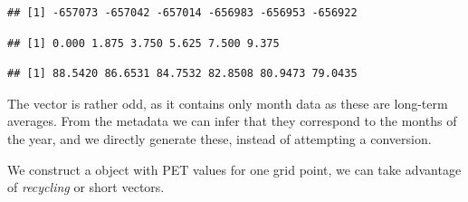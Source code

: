 \documentclass[krantz2,ChapterTOCs]{krantz}\usepackage{knitr}
\begin{document}
\begin{knitrout}\footnotesize
{}\color{fgcolor}\begin{kframe}
\begin{alltt}
 \hlkwb{<-}  \hlstd{)}
\end{alltt}
\begin{verbatim}
## [1] -657073 -657042 -657014 -656983 -656953 -656922
\end{verbatim}
\begin{alltt}
 \hlkwb{<-}   \hlstd{)}
\end{alltt}
\begin{verbatim}
## [1] 0.000 1.875 3.750 5.625 7.500 9.375
\end{verbatim}
\begin{alltt}
 \hlkwb{<-}  \hlstd{)}
\end{alltt}
\begin{verbatim}
## [1] 88.5420 86.6531 84.7532 82.8508 80.9473 79.0435
\end{verbatim}
\end{kframe}
\end{knitrout}

The  vector is rather odd, as it contains only month data as these are long-term averages. From the metadata we can infer that they correspond to the months of the year, and we directly generate these, instead of attempting a conversion.

We construct a  object with PET values for one grid point, we can take advantage of \emph{recycling} or short vectors.
\end{document}
